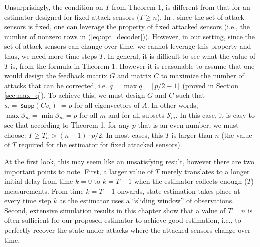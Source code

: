 \documentclass[../../thesis.tex]{subfiles}
\begin{document}
Unsurprisingly, the condition on $T$ from Theorem 1, is different from that for an estimator designed for fixed attack sensors ($T\geq n$). In \cite{Fawzi:2014}, since the set of attack sensors is fixed, one can leverage the property of fixed attacked sensors (i.e., the number of nonzero rows in (\ref{eq:opt_decoder})). However, in our setting, since the set of attack sensors can change over time, we cannot leverage this property and thus, we need more time steps $T$.
In general, it is difficult to see what the value of $T$ is, from the formula in Theorem 1. However it is reasonable to assume that one would design the feedback matrix $G$ and matrix $C$ to maximize the number of attacks that can be corrected, i.e. $q = \max q = \lceil p/2 - 1 \rceil$ (proved in Section \ref{sec:max_q}). To achieve this, we must design $G$ and $C$ such that $s_i = \lvert \textsf{supp} (C v_i) \rvert = p$ for all eigenvectors of $A$. In other words, $\operatorname{max} \mathcal{S}_m = \operatorname{min} \mathcal{S}_m = p$ for all $m$ and for all subsets $\mathcal{S}_m$. 
In this case, it is easy to see that according to Theorem 1, for any $p$ that is an even number, we must choose: $T\geq T_n > (n-1) \cdot p/2$.
In most cases, this $T$ is larger than $n$ (the value of $T$ required for the estimator for fixed attacked sensors).

At the first look, this may seem like an unsatisfying result, however there are two important points to note. First, a larger value of $T$ merely translates to a longer initial delay from time $k= 0$ to $k=T-1$ when the estimator collects enough ($T$) measurements. From time $k=T-1$ onwards, state estimation takes place at every time step $k$ as the estimator uses a ``sliding window'' of observations. Second, extensive simulation results in this chapter show that a value of $T = n$ is often sufficient for our proposed estimator to achieve good estimation, i.e., to perfectly recover the state under attacks where the attacked sensors change over time. 
\end{document}
